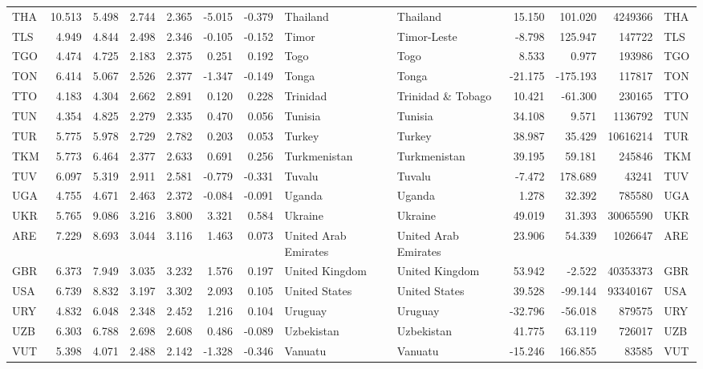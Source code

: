 \begin{tabular}{lrrrrrrllrrrl}
THA & 10.513 & 5.498 & 2.744 & 2.365 & -5.015 & -0.379 & Thailand & Thailand & 15.150 & 101.020 & 4249366 & THA \\
TLS & 4.949 & 4.844 & 2.498 & 2.346 & -0.105 & -0.152 & Timor & Timor-Leste & -8.798 & 125.947 & 147722 & TLS \\
TGO & 4.474 & 4.725 & 2.183 & 2.375 & 0.251 & 0.192 & Togo & Togo & 8.533 & 0.977 & 193986 & TGO \\
TON & 6.414 & 5.067 & 2.526 & 2.377 & -1.347 & -0.149 & Tonga & Tonga & -21.175 & -175.193 & 117817 & TON \\
TTO & 4.183 & 4.304 & 2.662 & 2.891 & 0.120 & 0.228 & Trinidad & Trinidad \& Tobago & 10.421 & -61.300 & 230165 & TTO \\
TUN & 4.354 & 4.825 & 2.279 & 2.335 & 0.470 & 0.056 & Tunisia & Tunisia & 34.108 & 9.571 & 1136792 & TUN \\
TUR & 5.775 & 5.978 & 2.729 & 2.782 & 0.203 & 0.053 & Turkey & Turkey & 38.987 & 35.429 & 10616214 & TUR \\
TKM & 5.773 & 6.464 & 2.377 & 2.633 & 0.691 & 0.256 & Turkmenistan & Turkmenistan & 39.195 & 59.181 & 245846 & TKM \\
TUV & 6.097 & 5.319 & 2.911 & 2.581 & -0.779 & -0.331 & Tuvalu & Tuvalu & -7.472 & 178.689 & 43241 & TUV \\
UGA & 4.755 & 4.671 & 2.463 & 2.372 & -0.084 & -0.091 & Uganda & Uganda & 1.278 & 32.392 & 785580 & UGA \\
UKR & 5.765 & 9.086 & 3.216 & 3.800 & 3.321 & 0.584 & Ukraine & Ukraine & 49.019 & 31.393 & 30065590 & UKR \\
ARE & 7.229 & 8.693 & 3.044 & 3.116 & 1.463 & 0.073 & United Arab Emirates & United Arab Emirates & 23.906 & 54.339 & 1026647 & ARE \\
GBR & 6.373 & 7.949 & 3.035 & 3.232 & 1.576 & 0.197 & United Kingdom & United Kingdom & 53.942 & -2.522 & 40353373 & GBR \\
USA & 6.739 & 8.832 & 3.197 & 3.302 & 2.093 & 0.105 & United States & United States & 39.528 & -99.144 & 93340167 & USA \\
URY & 4.832 & 6.048 & 2.348 & 2.452 & 1.216 & 0.104 & Uruguay & Uruguay & -32.796 & -56.018 & 879575 & URY \\
UZB & 6.303 & 6.788 & 2.698 & 2.608 & 0.486 & -0.089 & Uzbekistan & Uzbekistan & 41.775 & 63.119 & 726017 & UZB \\
VUT & 5.398 & 4.071 & 2.488 & 2.142 & -1.328 & -0.346 & Vanuatu & Vanuatu & -15.246 & 166.855 & 83585 & VUT \\

\end{tabular}
